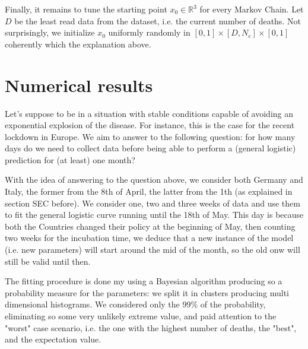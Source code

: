 \documentclass[8pt]{article}
\begin{document}
Finally, it remains to tune the starting point $x_0 \in \mathbb{R}^3$
for every Markov Chain. Let $D$ be
the least read data from the dataset, i.e. the current
number of deaths.
Not surprisingly, we initialize $x_0$ uniformly randomly in
$[0, 1] \times [D, N_e] \times [0,1]$ coherently which the explanation above.


\section{Numerical results}
Let's suppose to be in
a situation with stable conditions capable of avoiding an exponential
explosion of the disease. For instance, this is the case for the recent
lockdown in Europe.
We aim to answer to the following question:
for how many days do we need to collect data before being able 
to perform a (general logistic) prediction for (at least) one month?


With the idea of answering to the question above, we consider both Germany
and Italy, the former from the 8th of April, the latter from the 1th
(as explained in section SEC before). We consider one, two and three weeks
of data and use them to fit the general logistic curve running until the
18th of May. This day is because both the Countries
changed their policy at the beginning of May, then counting 
two weeks for the incubation time, we deduce that 
a new instance of the model (i.e. new parameters)
will start around the mid of the month, so the old onw will still be valid
until then.


The fitting procedure is done my using a Bayesian algorithm
producing so a probability measure for the parameters: we split it in
clusters producing multi dimensional histograms. We considered
only the 99\% of the probability, eliminating so some very
unlikely extreme value, and paid attention to
the "worst" case scenario, i.e. the one with the highest number of deaths, 
the "best", and the expectation value.
\end{document}
